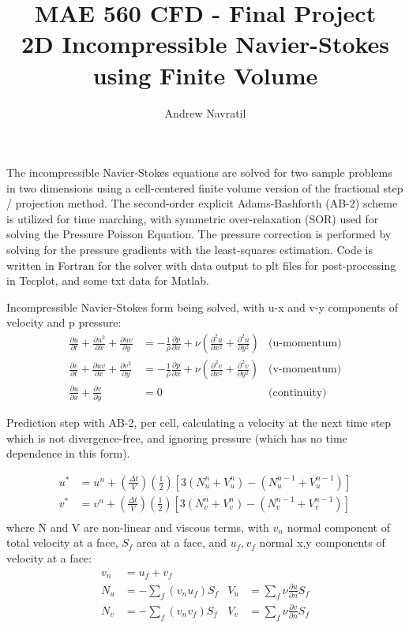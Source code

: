 \documentclass[conf]{new-aiaa}
\title{MAE 560 CFD - Final Project\\2D Incompressible Navier-Stokes using Finite Volume}
\author{Andrew Navratil}
\begin{document}
\maketitle

The incompressible Navier-Stokes equations are solved for two sample problems in two dimensions using a cell-centered finite volume version of the fractional step / projection method.  The second-order explicit Adams-Bashforth (AB-2) scheme is utilized for time marching, with symmetric over-relaxation (SOR) used for solving the Pressure Poisson Equation.  The pressure correction is performed by solving for the pressure gradients with the least-squares estimation.  Code is written in Fortran for the solver with data output to plt files for post-processing in Tecplot, and some txt data for Matlab.

\bigskip
Incompressible Navier-Stokes form being solved, with u-x and v-y components of velocity and p pressure:
\begin{align*}
	\frac{\partial u}{\partial t} + \frac{\partial u^2}{\partial x} + \frac{\partial uv}{\partial y} &= -\frac{1}{\rho}\frac{\partial p}{\partial x} + \nu \left(\frac{\partial^2 u}{\partial x^2} + \frac{\partial^2 u}{\partial y^2} \right) &\text{(u-momentum)}\\
	\frac{\partial v}{\partial t} + \frac{\partial uv}{\partial x} + \frac{\partial v^2}{\partial y} &= -\frac{1}{\rho}\frac{\partial p}{\partial x} + \nu \left(\frac{\partial^2 v}{\partial x^2} + \frac{\partial^2 v}{\partial y^2} \right) &\text{(v-momentum)}\\
	\frac{\partial u}{\partial x} + \frac{\partial v}{\partial y} &= 0 &\text{(continuity)}
\end{align*}

Prediction step with AB-2, per cell, calculating a velocity at the next time step which is not divergence-free, and ignoring pressure (which has no time dependence in this form).

\begin{align*}
	u^* &= u^n + \left(\frac{\Delta t}{V}\right) \left(\frac{1}{2}\right) [3(N_u^n+V_u^n)-(N_u^{n-1}+V_u^{n-1})] \\
	v^* &= v^n + \left(\frac{\Delta t}{V}\right) \left(\frac{1}{2}\right) [3(N_v^n+V_v^n)-(N_v^{n-1}+V_v^{n-1})] \\
\end{align*}
where N and V are non-linear and viscous terms, with $v_n$ normal component of total velocity at a face, $S_f$ area at a face, and $u_f,v_f$ normal x,y components of velocity at a face:
\begin{align*}
	v_n &= u_f + v_f & \\
	N_u &= -\sum_f (v_n u_f)S_f & V_u &= \sum_f \nu \frac{\partial u}{\partial n} S_f \\
	N_v &= -\sum_f (v_n v_f)S_f & V_v &= \sum_f \nu \frac{\partial v}{\partial n} S_f \\
\end{align*}
\end{document}
